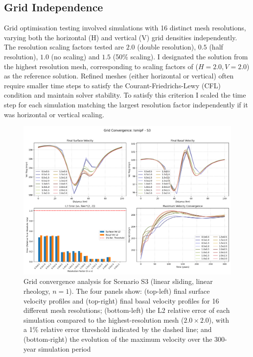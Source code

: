 \subsection{Grid Independence}\label{grid_ind}
Grid optimisation testing involved simulations with 16 distinct mesh resolutions, varying both the horizontal (H) and vertical (V) grid densities independently. The resolution scaling factors tested are $2.0$ (double resolution), $0.5$ (half resolution), $1.0$ (no scaling) and $1.5$ (50\% scaling). I designated the solution from the highest resolution mesh, corresponding to scaling factors of ($H=2.0, V=2.0$) as the reference solution. Refined meshes (either horizontal or vertical) often require smaller time steps to satisfy the Courant-Friedrichs-Lewy (CFL) condition and maintain solver stability. To satisfy this criterion I scaled the time step for each simulation matching the largest resolution factor independently if it was horizontal or vertical scaling.
\begin{figure}[H]
    \includegraphics[scale=0.40]{figures/IsmipF_S3_convergence_summary.png}
    \caption{Grid convergence analysis for Scenario S3 (linear sliding, linear rheology, $n=1$). The four panels show: (top-left) final surface velocity profiles and (top-right) final basal velocity profiles for 16 different mesh resolutions; (bottom-left) the L2 relative error of each simulation compared to the highest-resolution mesh ($2.0\times2.0$), with a 1\% relative error threshold indicated by the dashed line; and (bottom-right) the evolution of the maximum velocity over the 300-year simulation period}
    \label{fig:grid_conv_S3}
\end{figure}
